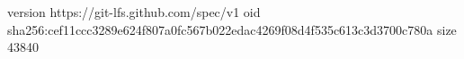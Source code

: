 version https://git-lfs.github.com/spec/v1
oid sha256:cef11ccc3289e624f807a0fc567b022edac4269f08d4f535c613c3d3700c780a
size 43840
